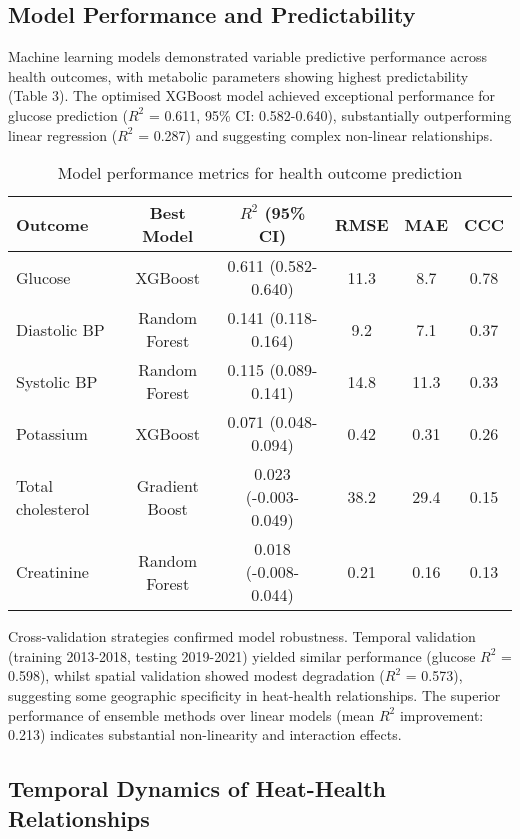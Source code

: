 \documentclass[11pt,a4paper]{article}
\begin{document}
\subsection{Model Performance and Predictability}

Machine learning models demonstrated variable predictive performance across health outcomes, with metabolic parameters showing highest predictability (Table 3). The optimised XGBoost model achieved exceptional performance for glucose prediction ($R^2$ = 0.611, 95\% CI: 0.582-0.640), substantially outperforming linear regression ($R^2$ = 0.287) and suggesting complex non-linear relationships.

\begin{table}[h!]
\centering
\caption{Model performance metrics for health outcome prediction}
\begin{tabular}{lccccc}
\toprule
\textbf{Outcome} & \textbf{Best Model} & \textbf{$R^2$ (95\% CI)} & \textbf{RMSE} & \textbf{MAE} & \textbf{CCC} \\
\midrule
Glucose & XGBoost & 0.611 (0.582-0.640) & 11.3 & 8.7 & 0.78 \\
Diastolic BP & Random Forest & 0.141 (0.118-0.164) & 9.2 & 7.1 & 0.37 \\
Systolic BP & Random Forest & 0.115 (0.089-0.141) & 14.8 & 11.3 & 0.33 \\
Potassium & XGBoost & 0.071 (0.048-0.094) & 0.42 & 0.31 & 0.26 \\
Total cholesterol & Gradient Boost & 0.023 (-0.003-0.049) & 38.2 & 29.4 & 0.15 \\
Creatinine & Random Forest & 0.018 (-0.008-0.044) & 0.21 & 0.16 & 0.13 \\
\bottomrule
\end{tabular}
\end{table}

Cross-validation strategies confirmed model robustness. Temporal validation (training 2013-2018, testing 2019-2021) yielded similar performance (glucose $R^2$ = 0.598), whilst spatial validation showed modest degradation ($R^2$ = 0.573), suggesting some geographic specificity in heat-health relationships. The superior performance of ensemble methods over linear models (mean $R^2$ improvement: 0.213) indicates substantial non-linearity and interaction effects.

\subsection{Temporal Dynamics of Heat-Health Relationships}
\end{document}
